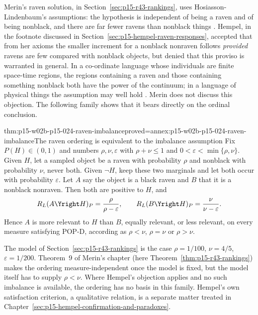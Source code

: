 Merin's raven solution, in Section~\ref{sec:p15-r43-rankings}, uses
Hosiasson-Lindenbaum's assumptions: the hypothesis is independent of
being a raven and of being nonblack, and there are far fewer ravens
than nonblack things \cite[pp.~271--272]{Merin2021Relevance}. Hempel,
in the footnote discussed in
Section~\ref{sec:p15-hempel-raven-responses}, accepted that from her
axioms the smaller increment for a nonblack nonraven follows
\emph{provided} ravens are few compared with nonblack objects, but
denied that this proviso is warranted in general. In a co-ordinate
language whose individuals are finite space-time regions, the regions
containing a raven and those containing something nonblack both have
the power of the continuum; in a language of physical things the
assumption may well hold \cite[I, p.~21, n.~2]{Hempel1945ConfirmationI}.
Merin does not discuss this objection. The following family shows that
it bears directly on the ordinal conclusion.

\begin{hbtheorem}{thm:p15-w02b-p15-024-raven-imbalance}{proved=annex:p15-w02b-p15-024-raven-imbalance}{The raven ordering is equivalent to the imbalance assumption}
Fix \(P(H)\in(0,1)\) and numbers \(\rho,\nu,\varepsilon\) with
\(\rho+\nu\leq1\) and \(0<\varepsilon<\min\{\rho,\nu\}\). Given
\(H\), let a sampled object be a raven with probability \(\rho\) and
nonblack with probability \(\nu\), never both. Given \(\neg H\), keep
these two marginals and let both occur with probability \(\varepsilon\).
Let \(A\) say the object is a black raven and \(B\) that it is a
nonblack nonraven. Then both are positive to \(H\), and
\[
 R_L(A\Yright H)_P=\frac{\rho}{\rho-\varepsilon},\qquad
 R_L(B\Yright H)_P=\frac{\nu}{\nu-\varepsilon}.
\]
Hence \(A\) is more relevant to \(H\) than \(B\), equally relevant,
or less relevant, on every measure satisfying POP-D, according as
\(\rho<\nu\), \(\rho=\nu\) or \(\rho>\nu\).
\end{hbtheorem}

The model of Section~\ref{sec:p15-r43-rankings} is the case
\(\rho=1/100\), \(\nu=4/5\), \(\varepsilon=1/200\). Theorem~9 of
Merin's chapter (here Theorem~\ref{thm:p15-r43-rankings}) makes the
ordering measure-independent once the model is fixed, but the model
itself has to supply \(\rho<\nu\). Where Hempel's objection applies and
no such imbalance is available, the ordering has no basis in this
family. Hempel's own satisfaction criterion, a qualitative relation,
is a separate matter treated in Chapter~\ref{sec:p15-hempel-confirmation-and-paradoxes}.

